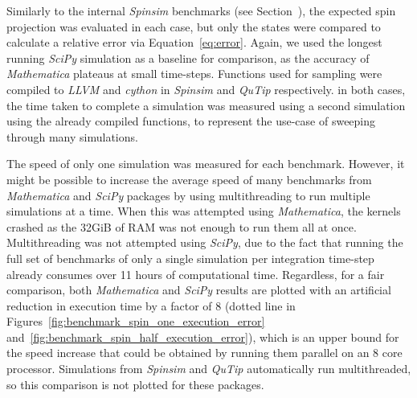 \documentclass{jors}
\begin{document}
		Similarly to the internal \emph{Spinsim} benchmarks (see Section~), the expected spin projection was evaluated in each case, but only the states were compared to calculate a relative error via Equation~\eqref{eq:error}.
		Again, we used the longest running \emph{SciPy} simulation as a baseline for comparison, as the accuracy of \emph{Mathematica} plateaus at small time-steps.
		Functions used for sampling were compiled to \emph{LLVM} and \emph{cython} in \emph{Spinsim} and \emph{QuTip} respectively.
		in both cases, the time taken to complete a simulation was measured using a second simulation using the already compiled functions, to represent the use-case of sweeping through many simulations.

		The speed of only one simulation was measured for each benchmark.
		However, it might be possible to increase the average speed of many benchmarks from \emph{Mathematica} and \emph{SciPy} packages by using multithreading to run multiple simulations at a time.
		When this was attempted using \emph{Mathematica}, the kernels crashed as the 32GiB of RAM was not enough to run them all at once.
		Multithreading was not attempted using \emph{SciPy}, due to the fact that running the full set of benchmarks of only a single simulation per integration time-step already consumes over 11 hours of computational time.
		Regardless, for a fair comparison, both \emph{Mathematica} and \emph{SciPy} results are plotted with an artificial reduction in execution time by a factor of 8 (dotted line in Figures~\ref{fig:benchmark_spin_one_execution_error} and~\ref{fig:benchmark_spin_half_execution_error}), which is an upper bound for the speed increase that could be obtained by running them parallel on an 8 core processor.
		Simulations from \emph{Spinsim} and \emph{QuTip} automatically run multithreaded, so this comparison is not plotted for these packages.
\end{document}
